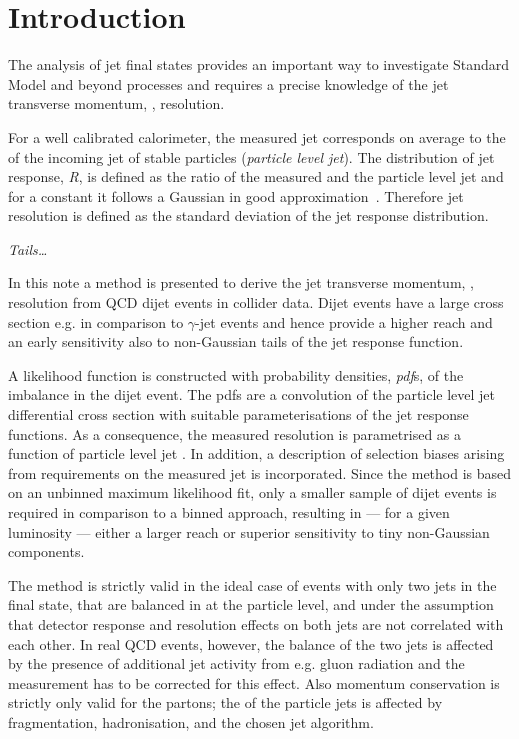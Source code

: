 

\section{Introduction}

The analysis of jet final states provides an important way to investigate Standard Model and beyond processes and requires a precise knowledge of the jet transverse momentum, \textit{\pt}, resolution.

For a well calibrated calorimeter, the measured jet \pt corresponds on average to the \pt of the incoming jet of stable particles (\textit{particle level jet}).
The distribution of jet response, \textit{R}, is defined as the ratio of the measured and the particle level jet \pt and for a constant \ptparticle it follows a Gaussian in good approximation~\cite{jetopgraphy}.
Therefore jet resolution is defined as the standard deviation of the jet response distribution.

\textit{Tails\ldots}

In this note a method is presented to derive the jet transverse momentum, \pt, resolution from QCD dijet events in collider data.
Dijet events have a large cross section e.g. in comparison to $\gamma$-jet events and hence provide a higher \pt reach and an early sensitivity also to non-Gaussian tails of the jet response function.

A likelihood function is constructed with probability densities, \textit{pdf}s, of the \pt imbalance in the dijet event.
The pdfs are a convolution of the particle level jet differential cross section with suitable parameterisations of the jet \pt response functions.
As a consequence, the measured resolution is parametrised as a function of particle level jet \pt.
In addition, a description of selection biases arising from requirements on the measured jet \pt is incorporated.
Since the method is based on an unbinned maximum likelihood fit, only a smaller sample of dijet events is required in comparison to a binned approach, resulting in --- for a given luminosity --- either a larger \pt reach or superior sensitivity to tiny non-Gaussian components.

The method is strictly valid in the ideal case of events with only two jets in the final state, that are balanced in \pt at the particle level, and under the assumption that detector response and resolution effects on both jets are not correlated with each other.
In real QCD events, however, the \pt balance of the two jets is affected by the presence of additional jet activity from e.g. gluon radiation and the measurement has to be corrected for this effect.
Also momentum conservation is strictly only valid for the partons; the \pt of the particle jets is affected by fragmentation, hadronisation, and the chosen jet algorithm.

